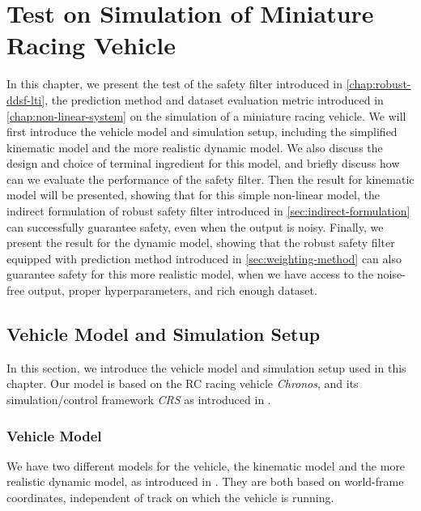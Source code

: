 \chapter{Test on Simulation of Miniature Racing Vehicle}\label{chap:test-chronos}

In this chapter, we present the test of the safety filter introduced in \cref{chap:robust-ddsf-lti}, the prediction method and dataset evaluation metric introduced in \cref{chap:non-linear-system} on the simulation of a miniature racing vehicle.
We will first introduce the vehicle model and simulation setup, including the simplified kinematic model and the more realistic dynamic model.
We also discuss the design and choice of terminal ingredient for this model, and briefly discuss how can we evaluate the performance of the safety filter.
Then the result for kinematic model will be presented, showing that for this simple non-linear model, the indirect formulation of robust safety filter introduced in \cref{sec:indirect-formulation} can successfully guarantee safety, even when the output is noisy.
Finally, we present the result for the dynamic model, showing that the robust safety filter equipped with prediction method introduced in \cref{sec:weighting-method} can also guarantee safety for this more realistic model, when we have access to the noise-free output, proper hyperparameters, and rich enough dataset.


\section{Vehicle Model and Simulation Setup}\label{sec:model-sim-setup}

In this section, we introduce the vehicle model and simulation setup used in this chapter.
Our model is based on the RC racing vehicle \emph{Chronos}, and its simulation/control framework \emph{CRS} as introduced in \cite{carronChronosCRSDesign2022}.

\subsection{Vehicle Model}\label{subsec:vehicle-model}

We have two different models for the vehicle, the kinematic model and the more realistic dynamic model, as introduced in \cite{carronChronosCRSDesign2022}.
They are both based on world-frame coordinates, independent of track on which the vehicle is running.

